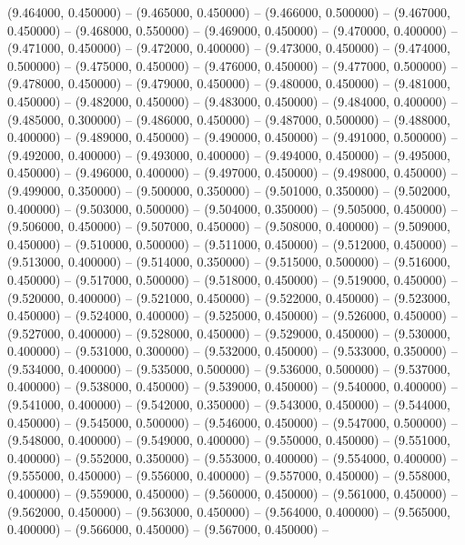 (9.464000, 0.450000) -- 
(9.465000, 0.450000) -- 
(9.466000, 0.500000) -- 
(9.467000, 0.450000) -- 
(9.468000, 0.550000) -- 
(9.469000, 0.450000) -- 
(9.470000, 0.400000) -- 
(9.471000, 0.450000) -- 
(9.472000, 0.400000) -- 
(9.473000, 0.450000) -- 
(9.474000, 0.500000) -- 
(9.475000, 0.450000) -- 
(9.476000, 0.450000) -- 
(9.477000, 0.500000) -- 
(9.478000, 0.450000) -- 
(9.479000, 0.450000) -- 
(9.480000, 0.450000) -- 
(9.481000, 0.450000) -- 
(9.482000, 0.450000) -- 
(9.483000, 0.450000) -- 
(9.484000, 0.400000) -- 
(9.485000, 0.300000) -- 
(9.486000, 0.450000) -- 
(9.487000, 0.500000) -- 
(9.488000, 0.400000) -- 
(9.489000, 0.450000) -- 
(9.490000, 0.450000) -- 
(9.491000, 0.500000) -- 
(9.492000, 0.400000) -- 
(9.493000, 0.400000) -- 
(9.494000, 0.450000) -- 
(9.495000, 0.450000) -- 
(9.496000, 0.400000) -- 
(9.497000, 0.450000) -- 
(9.498000, 0.450000) -- 
(9.499000, 0.350000) -- 
(9.500000, 0.350000) -- 
(9.501000, 0.350000) -- 
(9.502000, 0.400000) -- 
(9.503000, 0.500000) -- 
(9.504000, 0.350000) -- 
(9.505000, 0.450000) -- 
(9.506000, 0.450000) -- 
(9.507000, 0.450000) -- 
(9.508000, 0.400000) -- 
(9.509000, 0.450000) -- 
(9.510000, 0.500000) -- 
(9.511000, 0.450000) -- 
(9.512000, 0.450000) -- 
(9.513000, 0.400000) -- 
(9.514000, 0.350000) -- 
(9.515000, 0.500000) -- 
(9.516000, 0.450000) -- 
(9.517000, 0.500000) -- 
(9.518000, 0.450000) -- 
(9.519000, 0.450000) -- 
(9.520000, 0.400000) -- 
(9.521000, 0.450000) -- 
(9.522000, 0.450000) -- 
(9.523000, 0.450000) -- 
(9.524000, 0.400000) -- 
(9.525000, 0.450000) -- 
(9.526000, 0.450000) -- 
(9.527000, 0.400000) -- 
(9.528000, 0.450000) -- 
(9.529000, 0.450000) -- 
(9.530000, 0.400000) -- 
(9.531000, 0.300000) -- 
(9.532000, 0.450000) -- 
(9.533000, 0.350000) -- 
(9.534000, 0.400000) -- 
(9.535000, 0.500000) -- 
(9.536000, 0.500000) -- 
(9.537000, 0.400000) -- 
(9.538000, 0.450000) -- 
(9.539000, 0.450000) -- 
(9.540000, 0.400000) -- 
(9.541000, 0.400000) -- 
(9.542000, 0.350000) -- 
(9.543000, 0.450000) -- 
(9.544000, 0.450000) -- 
(9.545000, 0.500000) -- 
(9.546000, 0.450000) -- 
(9.547000, 0.500000) -- 
(9.548000, 0.400000) -- 
(9.549000, 0.400000) -- 
(9.550000, 0.450000) -- 
(9.551000, 0.400000) -- 
(9.552000, 0.350000) -- 
(9.553000, 0.400000) -- 
(9.554000, 0.400000) -- 
(9.555000, 0.450000) -- 
(9.556000, 0.400000) -- 
(9.557000, 0.450000) -- 
(9.558000, 0.400000) -- 
(9.559000, 0.450000) -- 
(9.560000, 0.450000) -- 
(9.561000, 0.450000) -- 
(9.562000, 0.450000) -- 
(9.563000, 0.450000) -- 
(9.564000, 0.400000) -- 
(9.565000, 0.400000) -- 
(9.566000, 0.450000) -- 
(9.567000, 0.450000) -- 

